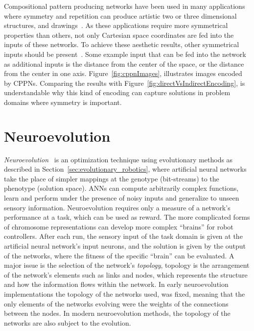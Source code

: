 
Compositional pattern producing networks have been used in many applications where symmetry and repetition can produce artistic two or three dimensional structures\footnotemark[2], and drawings\footnotemark[1]~\citep{secretan2008picbreeder}. As these applications require more symmetrical properties than others, not only Cartesian space coordinates are fed into the inputs of these networks. To achieve these aesthetic results, other symmetrical inputs should be present~\citep{secretan2008picbreeder}. Some example input that can be fed into the network as additional inputs is the distance from the center of the space, or the distance from the center in one axis. Figure~\ref{fig:cppnImages}, illustrates images encoded by CPPNs. Comparing the results with Figure~\ref{fig:directVsIndirectEncoding}, is understandable why this kind of encoding can capture solutions in problem domains where symmetry is important.




\section{Neuroevolution}

\emph{Neuroevolution}~\citep{yao1997new} is an optimization technique using evolutionary methods as described in Section~\ref{sec:evolutionary_robotics}, where artificial neural networks take the place of simpler mappings at the genotype (bit-streams) to the phenotype (solution space). ANNs can compute arbitrarily complex functions, learn and perform under the presence of noisy inputs and generalize to unseen sensory information. Neuroevolution requires only a measure of a network's performance at a task, which can be used as reward. The more complicated forms of chromosome representations can develop more complex ``brains'' for robot controllers. After each run, the sensory input of the task domain is given at the artificial neural network's input neurons, and the solution is given by the output of the networks, where the fitness of the specific ``brain'' can be evaluated. A major issue is the selection of the network's \emph{topology}, topology is the arrangement of the network's elements such as links and nodes, which represents the structure and how the information flows within the network. In early neuroevolution implementations the topology of the networks used, was fixed, meaning that the only elements of the networks evolving were the weights of the connections between the nodes. In modern neuroevolution methods, the topology of the networks are also subject to the evolution.

